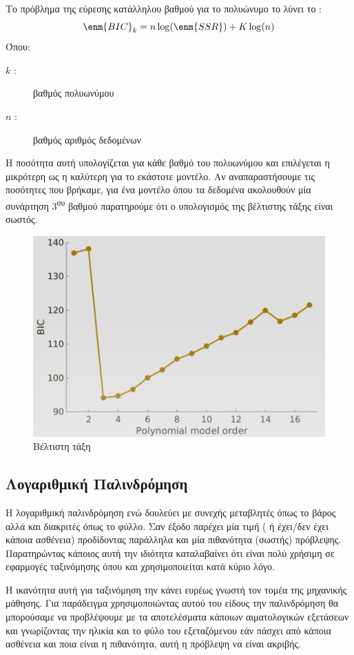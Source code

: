 Το πρόβλημα της εύρεσης κατάλληλου βαθμού για το πολυώνυμο το λύνει το :
$$\enm{BIC}_k=n\log (\enm{SSR})+K\log (n)$$
Όπου:
\begin{description}
    \item[$k$ :] βαθμός πολυωνύμου
    \item[$n$ :] βαθμός αριθμός δεδομένων
\end{description}
Η ποσότητα αυτή υπολογίζεται για κάθε βαθμό του πολυωνύμου και επιλέγεται η μικρότερη
ως η καλύτερη για το εκάστοτε μοντέλο. Αν αναπαραστήσουμε τις ποσότητες που
βρήκαμε, για ένα μοντέλο όπου τα δεδομένα ακολουθούν μία συνάρτηση 3\textsuperscript{ου} βαθμού
παρατηρούμε ότι ο υπολογισμός της βέλτιστης τάξης είναι σωστός.

\begin{figure}[H]
    \centering
    \includegraphics[width=1\textwidth]{images/BIC_2.png}
    \caption{Βέλτιστη τάξη}
\end{figure}
\subsection{Λογαριθμική Παλινδρόμηση}
Η λογαριθμική παλινδρόμηση ενώ δουλεύει με συνεχής μεταβλητές  όπως το βάρος αλλά και διακριτές
όπως το φύλλο. Σαν έξοδο παρέχει μία
 τιμή ( ή έχει/δεν έχει κάποια ασθένεια) προδίδοντας παράλληλα και μία
πιθανότητα (σωστής) πρόβλεψης. Παρατηρώντας κάποιος αυτή την ιδιότητα καταλαβαίνει
ότι είναι πολύ χρήσιμη σε εφαρμογές ταξινόμησης όπου και χρησιμοποιείται κατά κύριο
λόγο.

Η ικανότητα αυτή για ταξινόμηση την κάνει ευρέως γνωστή τον τομέα της μηχανικής
μάθησης. Για παράδειγμα χρησιμοποιώντας αυτού του είδους την παλινδρόμηση θα
μπορούσαμε να προβλέψουμε με τα αποτελέσματα κάποιων αιματολογικών εξετάσεων και
γνωρίζοντας την ηλικία και το φύλο του εξεταζόμενου εάν πάσχει από κάποια ασθένεια και
ποια είναι η πιθανότητα, αυτή η πρόβλεψη να είναι ακριβής.

